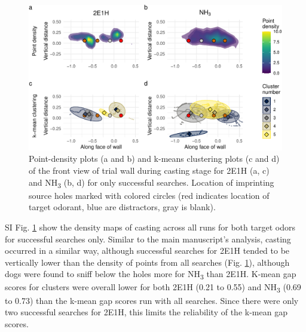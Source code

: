 \documentclass[
]{article}
\begin{document}
\begin{figure}
\centering
\includegraphics{supplementary-info_files/figure-latex/frontwall-casting-1.pdf}
\caption{\label{fig:frontwall-casting}Point-density plots (a and b) and k-means clustering plots (c and d) of the front view of trial wall during casting stage for 2E1H (a, c) and NH\textsubscript{3} (b, d) for only successful searches. Location of imprinting source holes marked with colored circles (red indicates location of target odorant, blue are distractors, gray is blank).}
\end{figure}

SI Fig. \ref{fig:frontwall-casting} show the density maps of casting across all runs for both target odors for successful searches only. Similar to the main manuscript's analysis, casting occurred in a similar way, although successful searches for 2E1H tended to be vertically lower than the density of points from all searches (Fig. \ref{fig:frontwall-casting}), although dogs were found to sniff below the holes more for NH\textsubscript{3} than 2E1H. K-mean gap scores for clusters were overall lower for both 2E1H (0.21 to 0.55) and NH\textsubscript{3} (0.69 to 0.73) than the k-mean gap scores run with all searches. Since there were only two successful searches for 2E1H, this limits the reliability of the k-mean gap scores.
\end{document}
